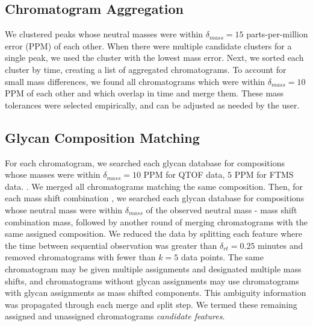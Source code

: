 \subsection{Chromatogram Aggregation}
    We clustered peaks whose neutral masses were within $\delta_{mass} = 15$ parts-per-million error
    (PPM) of each other. When there were multiple candidate clusters for a single peak,
    we used the cluster with the lowest mass error. Next, we sorted each cluster by time,
    creating a list of aggregated chromatograms. To account for small mass differences,
    we found all chromatograms which were within $\delta_{mass} = 10$ PPM of each other and which overlap
    in time and merge them. These mass tolerances were selected empirically, and can be
    adjusted as needed by the user.

\subsection{Glycan Composition Matching}
    For each chromatogram, we searched each glycan database for compositions
    whose masses were within $\delta_{mass} = 10$ PPM for QTOF data, $5$ PPM
    for FTMS data. . We merged all chromatograms
    matching the same composition. Then, for each mass shift combination , we searched each glycan database for compositions whose neutral
    mass were within $\delta_{mass}$ of the observed neutral mass - mass shift
    combination mass, followed by another round of merging chromatograms with the
    same assigned composition. We reduced the data by splitting each feature where the time
    between sequential observation was greater than $\delta_{rt} = 0.25$ minutes and
    removed chromatograms with fewer than $k = 5$ data points. The same chromatogram may be
    given multiple assignments and designated multiple mass shifts, and chromatograms
    without glycan assignments may use chromatograms with glycan assignments as mass shifted
    components. This ambiguity information was propagated through each merge and split step.
    We termed these remaining assigned and unassigned chromatograms \textit{candidate features}.
